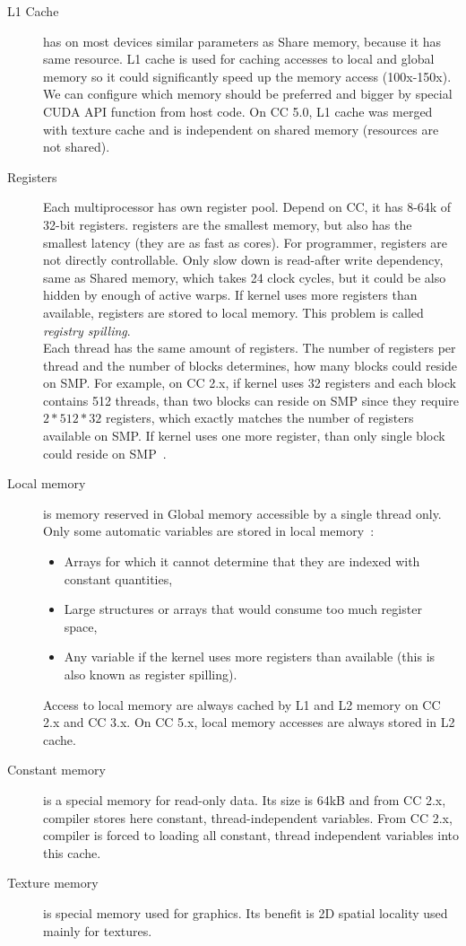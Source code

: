 \begin{description}
\item[L1 Cache] has on most devices similar parameters as Share memory, because it has same resource. L1 cache is used for caching accesses to local and global memory so it could significantly speed up the memory access (100x-150x). We can configure which memory should be preferred and bigger by special CUDA API function from host code. On CC 5.0, L1 cache was merged with texture cache and is independent on shared memory (resources are not shared).
\item[Registers] Each multiprocessor has own register pool. Depend on CC, it has 8-64k of 32-bit registers. registers are the smallest memory, but also has the smallest latency (they are as fast as cores). For programmer, registers are not directly controllable. Only slow down is read-after write dependency, same as Shared memory, which takes 24 clock cycles, but it could be also hidden by enough of active warps. If kernel uses more registers than available, registers are stored to local memory. This problem is called \textit{registry spilling}.\\
Each thread has the same amount of registers. The number of registers per thread and the number of blocks determines, how many blocks could reside on SMP. For example, on CC 2.x, if kernel uses 32 registers and each block contains 512 threads, than two blocks can reside on SMP since they require $2*512*32$ registers, which exactly matches the number of registers available on SMP. If kernel uses one more register, than only single block could reside on SMP~\cite{CUDAGuide}.
\item[Local memory] is memory reserved in Global memory accessible by a single thread only. Only some automatic variables are stored in local memory~\cite{CUDAGuide}:
\begin{itemize}
\item Arrays for which it cannot determine that they are indexed with constant quantities,
\item Large structures or arrays that would consume too much register space,
\item Any variable if the kernel uses more registers than available (this is also known as register spilling).
\end{itemize}
Access to local memory are always cached by L1 and L2 memory on CC 2.x and CC 3.x. On CC 5.x, local memory accesses are always stored in L2 cache. 

\item[Constant memory] is a special memory for read-only data. Its size is 64kB and from CC 2.x, compiler stores here constant, thread-independent variables. From CC 2.x, compiler is forced to loading all constant, thread independent variables into this cache.
\item[Texture memory] is special memory used for graphics. Its benefit is 2D spatial locality used mainly for textures.
\end{description}

